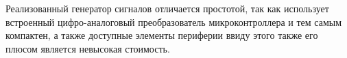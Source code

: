 \documentclass[14pt, oneside]{altsu-bachelor}
\begin{document}
Реализованный генератор сигналов отличается простотой, так как использует встроенный цифро-аналоговый преобразователь микроконтроллера и тем самым компактен, а также доступные элементы периферии ввиду этого также его плюсом является невысокая стоимость. 




\newpage
{}
\printbibliography[title={Список использованной литературы}]



\makelastpage
\end{document}
